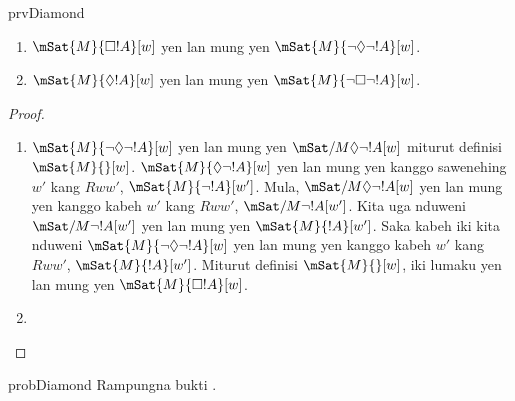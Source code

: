 \documentclass[../../../include/open-logic-section]{subfiles}
\begin{document}
\begin{tagblock}{prvDiamond}
\begin{prop}
  \begin{enumerate}
  \item $\mSat{M}{\Box !A}[w]$ yen lan mung yen $\mSat{M}{\lnot\Diamond\lnot !A}[w]$.
  \item $\mSat{M}{\Diamond !A}[w]$ yen lan mung yen $\mSat{M}{\lnot\Box\lnot !A}[w]$.
  \end{enumerate}
\end{prop}

\begin{proof}
  \begin{enumerate}
    \item $\mSat{M}{\lnot\Diamond\lnot !A}[w]$ yen lan mung yen $\mSat/{M}{\Diamond\lnot
      !A}[w]$ miturut definisi $\mSat{M}{}[w]$. $\mSat{M}{\Diamond\lnot
      !A}[w]$ yen lan mung yen kanggo sawenehing $w'$ kang $Rww'$, $\mSat{M}{\lnot
      !A}[w']$. Mula, $\mSat/{M}{\Diamond\lnot !A}[w]$ yen lan mung yen kanggo kabeh
    $w'$ kang $Rww'$, $\mSat/{M}{\lnot !A}[w']$. Kita uga nduweni
    $\mSat/{M}{\lnot !A}[w']$ yen lan mung yen $\mSat{M}{!A}[w']$. Saka kabeh iki kita nduweni
    $\mSat{M}{\lnot\Diamond\lnot !A}[w]$ yen lan mung yen kanggo kabeh $w'$ kang $Rww'$,
    $\mSat{M}{!A}[w']$. Miturut definisi $\mSat{M}{}[w]$, iki lumaku yen lan mung yen $\mSat{M}{\Box !A}[w]$.
    \item {}
  \end{enumerate}
\end{proof}

\begin{probtag}{probDiamond}
  Rampungna bukti .
\end{probtag}
\end{tagblock}
\end{document}
